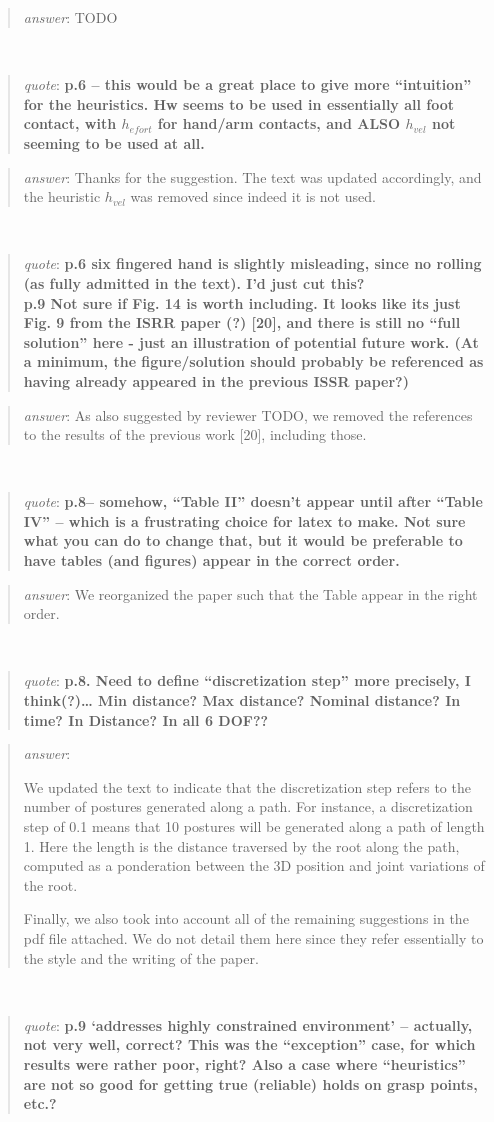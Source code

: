 \documentclass[a4paper]{article}
\newcommand\quot[1]{\begin{quote} \textit{quote}: \textbf{#1}\end{quote}}
\newcommand\as[1]{\begin{quote} \textit{answer}: {#1}\end{quote} \leavevmode \\ }
\begin{document}
\as{TODO}

\quot{
p.6 – this would be a great place to give more ``intuition'' for the heuristics. Hw seems to be used in essentially all foot contact, with $h_{efort}$ for hand/arm contacts, and ALSO $h_{vel}$ not seeming to be used at all.}
\as{Thanks for the suggestion. The text was updated accordingly, and the heuristic $h_{vel}$ was removed since indeed it is not used.}


\quot{
p.6 six fingered hand is slightly misleading, since no rolling (as fully admitted in the text). I'd just cut this? \\
p.9 Not sure if Fig. 14 is worth including. It looks like its just Fig. 9 from the ISRR paper (?) [20], and there is still no ``full solution'' here -
 just an illustration of potential future work. 
 (At a minimum, the figure/solution should probably be referenced as having already appeared in the previous ISSR paper?)
}

\as{As also suggested by reviewer TODO, we removed the references to the results of the previous work [20], including those.}

\quot{
p.8– somehow, “Table II” doesn’t appear until after “Table IV” – which is a frustrating choice for latex to make. Not sure what you can do to change that, but it would be preferable to have tables (and figures) appear in the correct order.
}

\as{We reorganized the paper such that the Table appear in the right order.}

\quot{
p.8. Need to define ``discretization step'' more precisely, I think(?)… Min distance? Max distance? Nominal distance? In time? In Distance? In all 6 DOF??
}

\as{We updated the text to indicate that the discretization step refers to the number of postures generated along a path. For instance, a discretization step of 0.1 means
that 10 postures will be generated along a path of length 1. Here the length is the distance traversed by the root along the path, computed as a ponderation between the 3D position and joint variations of the root.

Finally, we also took into account all of the remaining suggestions in the pdf file attached. We do not detail them here since they refer essentially to the style 
and the writing of the paper.}

\quot{
p.9 ‘addresses highly constrained environment’ – actually, not very well, correct? This was the “exception” case, for which results were rather poor, right? Also a case where “heuristics” are not so good for getting true (reliable) holds on grasp points, etc.?
}
\end{document}
